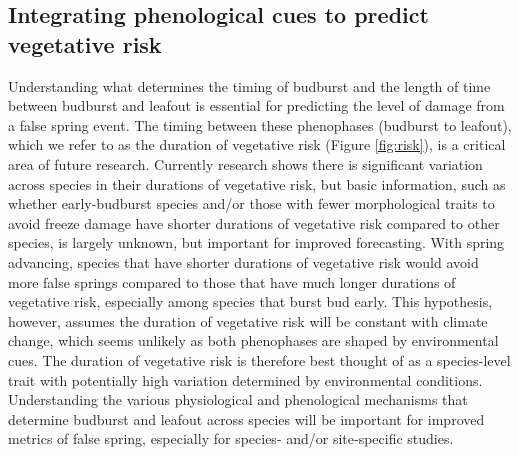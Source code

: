 \documentclass{article}\usepackage[]{graphicx}\usepackage[]{color}
\begin{document}
\subsection*{Integrating phenological cues to predict vegetative risk}
Understanding what determines the timing of budburst and the length of time between budburst and leafout is essential for predicting the level of damage from a false spring event. The timing between these phenophases (budburst to leafout), which we refer to as the duration of vegetative risk (Figure \ref{fig:risk}), is a critical area of future research. Currently research shows there is significant variation across species in their durations of vegetative risk, but basic information, such as whether early-budburst species and/or those with fewer morphological traits to avoid freeze damage have shorter durations of vegetative risk compared to other species, is largely unknown, but important for improved forecasting. With spring advancing, species that have shorter durations of vegetative risk would avoid more false springs compared to those that have much longer durations of vegetative risk, especially among species that burst bud early. This hypothesis, however, assumes the duration of vegetative risk will be constant with climate change, which seems unlikely as both phenophases are shaped by environmental cues. The duration of vegetative risk is therefore best thought of as a species-level trait with potentially high variation determined by environmental conditions. Understanding the various physiological and phenological mechanisms that determine budburst and leafout across species will be important for improved metrics of false spring, especially for species- and/or site-specific studies. 
\end{document}
